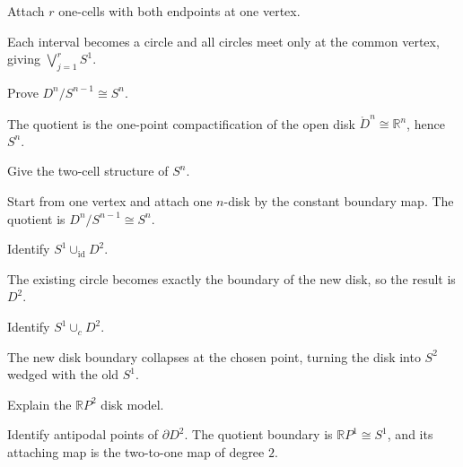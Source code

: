 \begin{problem}\label{prob:viii05-05}
Attach \(r\) one-cells with both endpoints at one vertex.
\end{problem}
\begin{solution}
Each interval becomes a circle and all circles meet only at the common vertex, giving \(\bigvee_{j=1}^rS^1\).
\end{solution}

\begin{problem}\label{prob:viii05-06}
Prove \(D^n/S^{n-1}\cong S^n\).
\end{problem}
\begin{solution}
The quotient is the one-point compactification of the open disk \(\mathring D^n\cong\mathbb R^n\), hence \(S^n\).
\end{solution}

\begin{problem}\label{prob:viii05-07}
Give the two-cell structure of \(S^n\).
\end{problem}
\begin{solution}
Start from one vertex and attach one \(n\)-disk by the constant boundary map.  The quotient is \(D^n/S^{n-1}\cong S^n\).
\end{solution}

\begin{problem}\label{prob:viii05-08}
Identify \(S^1\cup_{\operatorname{id}}D^2\).
\end{problem}
\begin{solution}
The existing circle becomes exactly the boundary of the new disk, so the result is \(D^2\).
\end{solution}

\begin{problem}\label{prob:viii05-09}
Identify \(S^1\cup_cD^2\).
\end{problem}
\begin{solution}
The new disk boundary collapses at the chosen point, turning the disk into \(S^2\) wedged with the old \(S^1\).
\end{solution}

\begin{problem}\label{prob:viii05-10}
Explain the \(\mathbb RP^2\) disk model.
\end{problem}
\begin{solution}
Identify antipodal points of \(\partial D^2\).  The quotient boundary is \(\mathbb RP^1\cong S^1\), and its attaching map is the two-to-one map of degree \(2\).
\end{solution}

